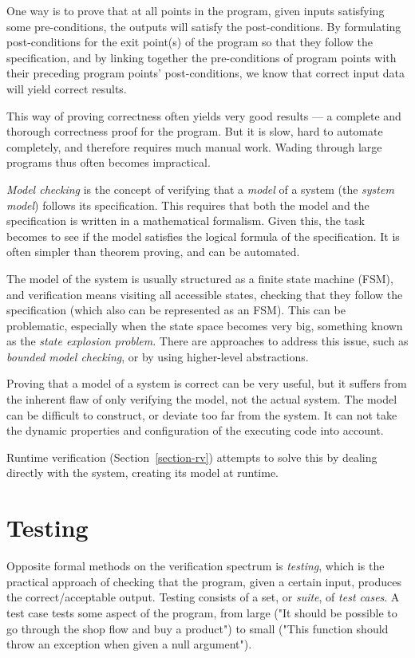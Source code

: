 \documentclass[a4paper,11pt]{kth-mag}
\begin{document}
One way is to prove that at all points in the program, given inputs satisfying
some pre-conditions, the outputs will satisfy the post-conditions. By
formulating post-conditions for the exit point(s) of the program so that they
follow the specification, and by linking together the pre-conditions of program
points with their preceding program points' post-conditions, we know that
correct input data will yield correct results.

This way of proving correctness often yields very good results --- a complete
and thorough correctness proof for the program. But it is slow, hard to
automate completely, and therefore requires much manual work.  Wading through
large programs thus often becomes impractical.

\textit{Model checking} is the concept of verifying that a \textit{model} of a
system (the \textit{system model}) follows its specification. This requires
that both the model and the specification is written in a mathematical
formalism. Given this, the task becomes to see if the model satisfies the
logical formula of the specification. It is often simpler than theorem proving,
and can be automated.

The model of the system is usually structured as a finite state machine (FSM),
and verification means visiting all accessible states, checking that they
follow the specification (which also can be represented as an FSM). This can be
problematic, especially when the state space becomes very big, something known
as the \textit{state explosion problem}. There are approaches to address this
issue, such as \textit{bounded model checking}, or by using higher-level
abstractions.

Proving that a model of a system is correct can be very useful, but it suffers
from the inherent flaw of only verifying the model, not the actual system. The
model can be difficult to construct, or deviate too far from the system. It can
not take the dynamic properties and configuration of the executing code into
account.

Runtime verification (Section~\ref{section-rv}) attempts to solve this by
dealing directly with the system, creating its model at runtime.


\section{Testing} \label{section-testing}
Opposite formal methods on the verification spectrum is \emph{testing}, which
is the practical approach of checking that the program, given a certain input,
produces the correct/acceptable output. Testing consists of a set, or
\textit{suite}, of \textit{test cases}. A test case tests some aspect of the
program, from large ("It should be possible to go through the shop flow and buy
a product") to small ("This function should throw an exception when given a
null argument").
\end{document}
